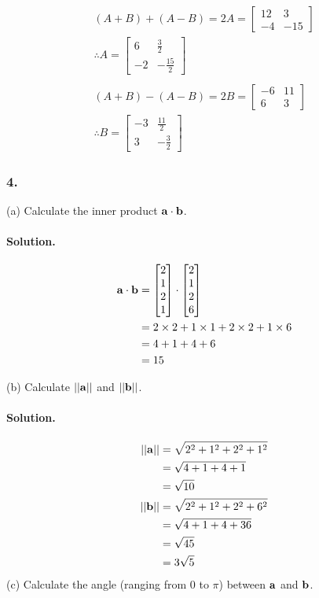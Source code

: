 \begin{gather*}
    (A + B) + (A - B) = 2A = \begin{bmatrix}
        12&3\\-4&-15
    \end{bmatrix}\\
    \therefore A = \begin{bmatrix}
        6 & \frac{3}{2}\\
        -2&-\frac{15}{2}
    \end{bmatrix}\\\\
    (A + B) - (A - B) = 2B = \begin{bmatrix}
        -6&11\\6&3
    \end{bmatrix}\\
    \therefore B = \begin{bmatrix}
        -3 & \frac{11}{2}\\
        3&-\frac{3}{2}
    \end{bmatrix}
\end{gather*}

\subsubsection{4.}
(a) Calculate the inner product $\vb{a}\cdot\vb{b}$.
\paragraph{Solution.}
\begin{align*}
    \vb{a}\cdot\vb{b} &= \begin{bmatrix}
        2\\1\\2\\1
    \end{bmatrix} \cdot \begin{bmatrix}
        2\\1\\2\\6
    \end{bmatrix}\\&= 2 \times 2 + 1 \times 1 + 2 \times 2 + 1 \times 6\\&= 4 + 1 + 4 + 6\\&= 15
\end{align*}

(b) Calculate $||\vb{a}||$ and $||\vb{b}||$.
\paragraph{Solution.}
\begin{align*}
    ||\vb{a}|| &= \sqrt{2^2 + 1^2 + 2^2 + 1^2}\\&= \sqrt{4 + 1 + 4 + 1}\\&= \sqrt{10}\\
    ||\vb{b}|| &= \sqrt{2^2 + 1^2 + 2^2 + 6^2}\\&= \sqrt{4 + 1 + 4 + 36}\\&= \sqrt{45}\\&= 3\sqrt{5}
\end{align*}
\newpage
(c) Calculate the angle (ranging from $0$ to $\pi$) between $\vb{a}$ and $\vb{b}$.
